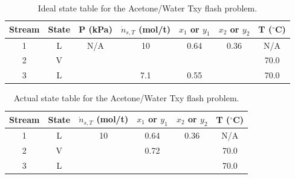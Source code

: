 {  \clearpage

\begin{table}[!ht]
    \centering
    \caption{Ideal state table for the Acetone/Water Txy flash problem.}\label{tbl-state-flash-problem-txy}
    \renewcommand{\arraystretch}{2.0}
    \setlength{\tabcolsep}{18pt}
    \begin{tabular}{c|c|c|c|c|c|c}\toprule
    Stream & State & P (kPa) & $\dot{n}_{s,T}$ (mol/t) & $x_{1}$ or $y_{1}$ & $x_{2}$ or $y_{2}$ & T ($^{\circ}$C) \\ \toprule
    1 & L & N/A & 10 & 0.64 & 0.36 & N/A \\ \hline
    2 & V & & & & & 70.0 \\ \hline
    3 & L & & 7.1 & 0.55 & & 70.0 \\ \bottomrule
    \end{tabular}
  \end{table}

  \clearpage

  \begin{table}[!ht]
    \centering
    \caption{Actual state table for the Acetone/Water Txy flash problem.}\label{tbl-state-flash-problem-txy-actual}
    \renewcommand{\arraystretch}{2.0}
    \setlength{\tabcolsep}{18pt}
    \begin{tabular}{c|c|c|c|c|c}\toprule
    Stream & State & $\dot{n}_{s,T}$ (mol/t) & $x_{1}$ or $y_{1}$ & $x_{2}$ or $y_{2}$ & T ($^{\circ}$C) \\ \toprule
    1 & L & 10 & 0.64 & 0.36 & N/A \\ \hline
    2 & V & & 0.72 & & 70.0 \\ \hline
    3 & L & & & & 70.0 \\ \bottomrule
    \end{tabular}
  \end{table}
}